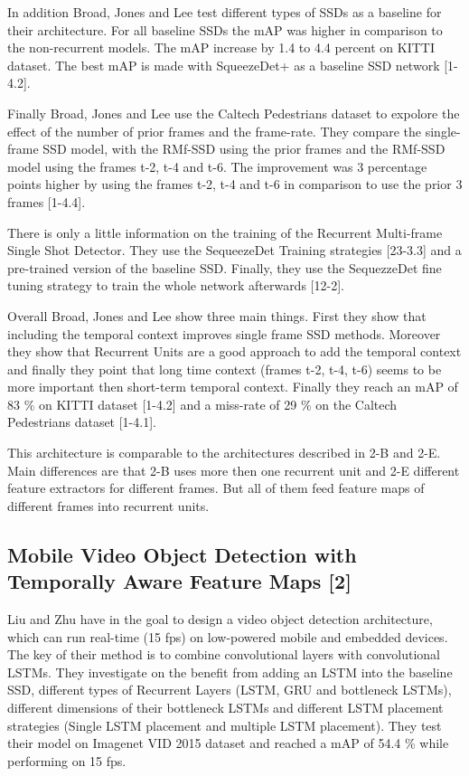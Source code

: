 \documentclass[conference]{IEEEtran}
\begin{document}
In addition Broad, Jones and Lee test different types of SSDs as a baseline for their architecture. For all baseline SSDs the mAP was higher in comparison to the non-recurrent models. The mAP increase by 1.4 to 4.4 percent on KITTI dataset.  The best mAP is made with SqueezeDet+ \cite{b23} as a baseline SSD network [1-4.2].  \newline

Finally Broad, Jones and Lee use the Caltech Pedestrians dataset to expolore the effect of the number of prior frames and the frame-rate. They compare the single-frame SSD model, with the RMf-SSD using the prior frames and the RMf-SSD model using the frames t-2, t-4 and t-6. The improvement was 3 percentage points higher by using the frames t-2, t-4 and t-6 in comparison to use the prior 3 frames [1-4.4]. \newline  

There is only a little information on the training of the Recurrent Multi-frame Single Shot Detector. They use the SequeezeDet Training strategies [23-3.3] and a pre-trained version of the baseline SSD. Finally, they use the SequezzeDet fine tuning strategy to train the whole network afterwards [12-2]. \newline

Overall Broad, Jones and Lee show three main things. First they show that including the temporal context improves single frame SSD methods. Moreover they show that Recurrent Units are a good approach to add the temporal context and finally they point that long time context (frames t-2, t-4, t-6) seems to be more important then short-term temporal context. Finally they reach an mAP of 83 \% on KITTI dataset [1-4.2] and a miss-rate of 29 \% on the Caltech Pedestrians dataset [1-4.1]. \newline

This architecture is comparable to the architectures described in 2-B and 2-E. Main differences are that 2-B uses more then one recurrent unit and 2-E different feature extractors for different frames. But all of them feed feature maps of different frames into recurrent units. 
 
\subsection{Mobile Video Object Detection with Temporally Aware Feature Maps [2]}
Liu and Zhu have in \cite{b2} the goal to design a video object detection architecture, which can run real-time (15 fps) on low-powered mobile and embedded devices. The key of their method is to combine convolutional layers with convolutional LSTMs. They investigate on the benefit from adding an LSTM into the baseline SSD, different types of Recurrent Layers (LSTM, GRU and bottleneck LSTMs), different dimensions of their bottleneck LSTMs and different LSTM placement strategies (Single LSTM placement and multiple LSTM placement). They test their model on Imagenet VID 2015 dataset \cite{b35} and reached a mAP of 54.4 \% while performing on 15 fps.  \newline
\end{document}
